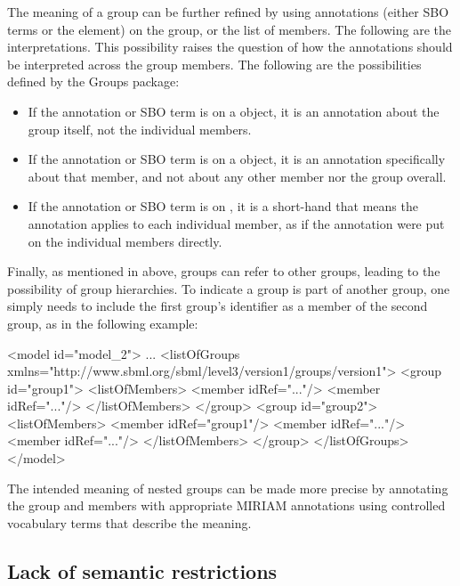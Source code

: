 The meaning of a group can be further refined by using annotations (either SBO terms or the \Annotation element) on the group, or the list of members. The following are the interpretations.  This possibility raises the question of how the annotations should be interpreted across the group members.  The following are the possibilities defined by the Groups package:

\begin{itemize}

\item If the annotation or SBO term is on a \Group object, it is an annotation about the group itself, not the individual members.

\item If the annotation or SBO term is on a \Member object, it is an annotation specifically about that member, and not about any other member nor the group overall.

\item If the annotation or SBO term is on \ListOfMembers, it is a short-hand that means the annotation applies to each individual member, as if the annotation were put on the individual members directly.

\end{itemize}

Finally, as mentioned in  above, groups can refer to other groups, leading to the possibility of group hierarchies. To indicate a group is part of another group, one simply needs to include the first group's identifier as a member of the second group, as in the following example:

\clearpage

\begin{example}
<model id="model_2"> 
  ... 
  <listOfGroups xmlns="http://www.sbml.org/sbml/level3/version1/groups/version1"> 
    <group id="group1"> 
      <listOfMembers> 
        <member idRef="..."/> 
        <member idRef="..."/> 
      </listOfMembers> 
    </group> 
    <group id="group2"> 
      <listOfMembers> 
        <member idRef="group1"/> 
        <member idRef="..."/> 
        <member idRef="..."/> 
      </listOfMembers> 
    </group> 
  </listOfGroups> 
</model> 
\end{example}

The intended meaning of nested groups can be made more precise by annotating the group and members with appropriate MIRIAM annotations using controlled vocabulary terms that describe the meaning.


\subsection{Lack of semantic restrictions}
\label{semantic-restrictions}

